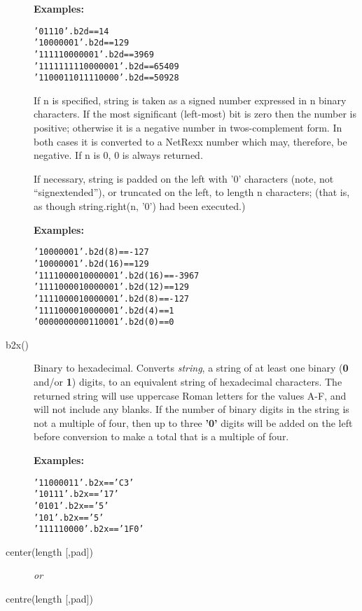 \begin{description}
\textbf{Examples:}
\begin{alltt}
'01110'.b2d == 14 
'10000001'.b2d == 129 
'111110000001'.b2d == 3969 
'1111111110000001'.b2d == 65409 
'1100011011110000'.b2d == 50928 
\end{alltt}
If n is specified, string is taken as a signed number expressed in n binary characters. If the most significant (left-most) bit is zero then the number is positive; otherwise it is a negative number in twos-complement form. In both cases it is converted to a NetRexx number which may, therefore, be negative. If n is 0, 0 is always returned.

If necessary, string is padded on the left with '0' characters (note, not “signextended”), or truncated on the left, to length n characters; (that is, as though string.right(n, '0') had been executed.)

\textbf{Examples:}
\begin{alltt}
'10000001'.b2d(8) == -127 
'10000001'.b2d(16) == 129 
'1111000010000001'.b2d(16) == -3967 
'1111000010000001'.b2d(12) == 129 
'1111000010000001'.b2d(8) == -127 
'1111000010000001'.b2d(4) == 1 
'0000000000110001'.b2d(0) == 0
\end{alltt} 
\item[b2x()]\label{refb2x}
Binary to hexadecimal.
Converts \emph{string}, a string of at least one binary
(\textbf{0} and/or \textbf{1}) digits, to an equivalent string of
hexadecimal characters.
The returned string will use uppercase Roman letters for the values A-F,
and will not include any blanks.
 If the number of binary digits in the string is not a multiple of four,
then up to three \textbf{'0'} digits will be added on the left before
conversion to make a total that is a multiple of four.
 
\textbf{Examples:}
\begin{alltt}
'11000011'.b2x  == 'C3'
'10111'.b2x     == '17'
'0101'.b2x      == '5'
'101'.b2x       == '5'
'111110000'.b2x == '1F0'
\end{alltt}
  
\item[center(length [,pad{]})]\label{refcenter}

\emph{or}
\item[centre(length [,pad{]})]\label{refcentre}


\end{description}
